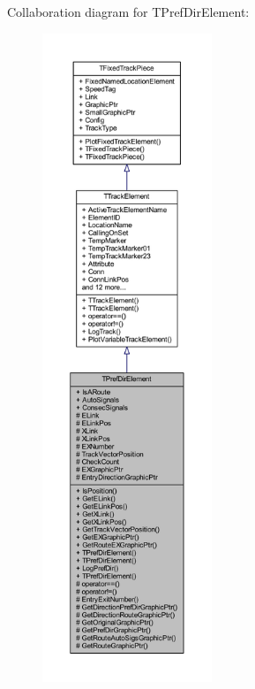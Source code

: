 Collaboration diagram for T\+Pref\+Dir\+Element\+:
\nopagebreak
\begin{figure}[H]
\begin{center}
\leavevmode
\includegraphics[height=550pt]{class_t_pref_dir_element__coll__graph}
\end{center}
\end{figure}
